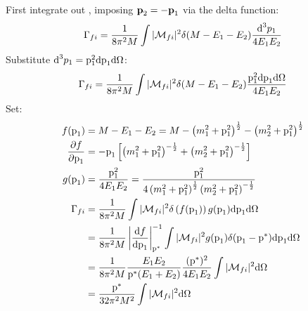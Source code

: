 \begin{enumerate}
          \begin{solution}
              First integrate out \pvecc, imposing $\textbf{p}_2 = -\textbf{p}_1$ via the delta function:
              \begin{align*}
                  \Gamma_{fi} = \frac{1}{8\pi^2M} \int |\mathcal{M}_{fi}|^2
                  \delta(M - E_1 - E_2)
                  \frac{\text{d}^3p_1}{4E_1E_2}
              \end{align*}
              Substitute $\text{d}^3p_1 = \text{p}_1^2\text{d}\text{p}_1\text{d}\Omega$:
              \begin{align*}
                  \Gamma_{fi} = \frac{1}{8\pi^2M} \int |\mathcal{M}_{fi}|^2
                  \delta(M - E_1 - E_2)
                  \frac{\text{p}_1^2\text{d}\text{p}_1\text{d}\Omega}{4E_1E_2}
              \end{align*}
              Set:
              \begin{align*}
                  f(\text{p}_1)                          & = M-E_1-E_2 = M - \left(m_1^2+\text{p}_1^2\right)^\frac{1}{2}
                  - \left(m_2^2+\text{p}_1^2\right)^\frac{1}{2}                                                         \\
                  \frac{\partial f}{\partial \text{p}_1} & =
                  -\text{p}_1\left[\left(m_1^2+\text{p}_1^2\right)^{-\frac{1}{2}}
                  + \left(m_2^2+\text{p}_1^2\right)^{-\frac{1}{2}}\right]                                               \\
                  g(\text{p}_1)                          & = \frac{\text{p}_1^2}{4E_1E_2}
                  = \frac{\text{p}_1^2}{4\left(m_1^2+\text{p}_1^2\right)^\frac{1}{2}
                  \left(m_2^2+\text{p}_1^2\right)^{-\frac{1}{2}}}                                                       \\
                  \Gamma_{fi}                           & = \frac{1}{8\pi^2M} \int |\mathcal{M}_{fi}|^2
                  \delta\left(f(\text{p}_1)\right) g(\text{p}_1) \text{d}\text{p}_1\text{d}\Omega                         \\
                                                        & = \frac{1}{8\pi^2M}
                  \left|\frac{\text{d}f}{\text{d}\text{p}_1}\right|_{\text{p}^{*}}^{-1}
                  \int |\mathcal{M}_{fi}|^2
                  g(\text{p}_1)\delta(\text{p}_1 - \text{p}^{*})\text{d}\text{p}_1\text{d}\Omega                          \\
                                                        & = \frac{1}{8\pi^2M}
                  \frac{E_1E_2}{\text{p}^{*}(E_1+E_2)} \frac{(\text{p}^{*})^2}{4E_1E_2}
                  \int |\mathcal{M}_{fi}|^2\text{d}\Omega                                                              \\
                                                        & = \frac{\text{p}^{*}}{32\pi^2M^2}
                  \int |\mathcal{M}_{fi}|^2\text{d}\Omega
              \end{align*}
          \end{solution}
\end{enumerate}
